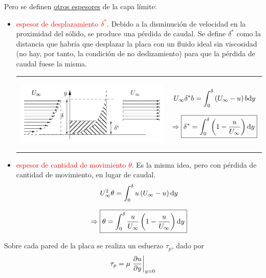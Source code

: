 	Pero se definen \href{https://en.wikipedia.org/wiki/Boundary_layer_thickness}{otros espesores}
	de la capa límite:
	
	\begin{itemize}
		\item \textcolor{red}{espesor de desplazamiento $\delta^{*}$}. Debido a
		la disminución de velocidad en la proximidad del sólido, se produce
		una pérdida de caudal. Se define $\delta^{*}$ como la distancia que
		habría que desplazar la placa con un fluido ideal sin viscosidad (no
		hay, por tanto, la condición de no deslizamiento) para que la pérdida
		de caudal fuese la misma.
		
		\begin{tabular}{cc}
			\begin{minipage}[c]{0.4\textwidth}%
\begin{center}
	\includegraphics[width=\linewidth]{TeX_files/chapter08-CapaLimite/capa2}
\end{center}

			\end{minipage} & %
			\begin{minipage}[c]{0.5\textwidth}%
				
				\[
				U_{\infty}\delta^{*}b=\int_{0}^{\delta}\left(U_{\infty}-u\right)b\text{d} y
				\]
				
				
				\begin{equation}
					\Rightarrow\boxed{\delta^{*}=\int_{0}^{\delta}\left(1-\frac{u}{U_{\infty}}\right)\text{d} y}
				\end{equation}
				
			\end{minipage}\tabularnewline
		\end{tabular}

		\item \textcolor{red}{espesor de cantidad de movimiento $\theta$}. Es la
		misma idea, pero con pérdida de cantidad de movimiento, en lugar de
		caudal. 
		\[
		U_{\infty}^{2}\theta=\int_{0}^{\delta}u\left(U_{\infty}-u\right)\text{d} y
		\]
		
		\begin{equation}
			\Rightarrow\boxed{\theta=\int_{0}^{\delta}\frac{u}{U_{\infty}}\left(1-\frac{u}{U_{\infty}}\right)\text{d} y}
		\end{equation}
		
		
	\end{itemize}
	Sobre cada pared de la placa se realiza un esfuerzo $\tau_{p}$, dado
	por 
	\[
	\tau_{p}=\mu\left.\frac{\partial u}{\partial y}\right|_{y=0}
	\]
	
